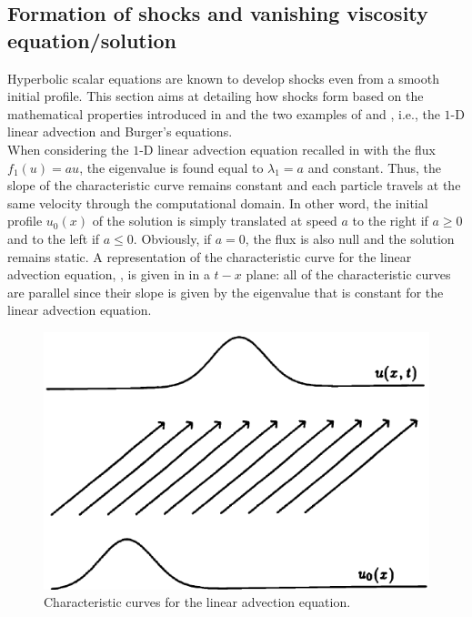 \subsection{Formation of shocks and vanishing viscosity equation/solution}\label{sec:shock_form_sct1b}
Hyperbolic scalar equations are known to develop shocks even from a smooth initial profile. This section aims at detailing how shocks form based on the mathematical properties introduced in  and the two examples of  and , i.e., the $1$-D linear advection and Burger's equations.\\

When considering the $1$-D linear advection equation recalled in  with the flux $f_1(u) = au$, the eigenvalue is found equal to $\lambda_1=a$ and constant. Thus, the slope of the characteristic curve remains constant and each particle travels at the same velocity through the computational domain. In other word, the initial profile $u_0(x)$ of the solution is simply translated at speed $a$ to the right if $a \geq 0$ and to the left if $a \leq 0$. Obviously, if $a=0$, the flux is also null and the solution remains static. A representation of the characteristic curve for the linear advection equation, , is given in  in a $t-x$ plane: all of the characteristic curves are parallel since their slope is given by the eigenvalue that is constant for the linear advection equation.
%
\begin{figure}[H]
\centering
\includegraphics[width=\textwidth]{figures/charact_curves_linear_transport.png}
\caption{Characteristic curves for the linear advection equation.}
\label{fig:char_curve_sct1b}
\end{figure}
